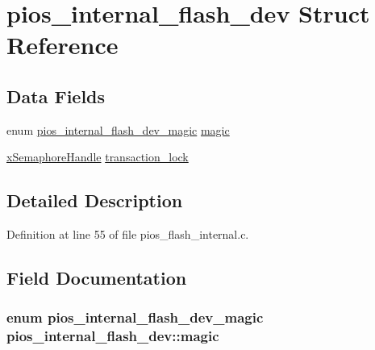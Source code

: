 \hypertarget{structpios__internal__flash__dev}{\section{pios\-\_\-internal\-\_\-flash\-\_\-dev Struct Reference}
\label{structpios__internal__flash__dev}
}
\subsection*{Data Fields}
\begin{DoxyCompactItemize}
\item 
enum \hyperlink{_s_t_m32_f30x_2pios__flash__internal_8c_a0eb1120efd5b8655fe38c410b3eebd5c}{pios\-\_\-internal\-\_\-flash\-\_\-dev\-\_\-magic} \hyperlink{structpios__internal__flash__dev_a552d26ec63649d447047928674b6735e}{magic}
\item 
\hyperlink{_common_2_libraries_2_free_r_t_o_s_2_source_2include_2semphr_8h_aa91aa1b6835a184838f9ccf138a6ad10}{x\-Semaphore\-Handle} \hyperlink{structpios__internal__flash__dev_aff0936adda4381f50332373503f0f34e}{transaction\-\_\-lock}
\end{DoxyCompactItemize}


\subsection{Detailed Description}


Definition at line 55 of file pios\-\_\-flash\-\_\-internal.\-c.



\subsection{Field Documentation}
\hypertarget{structpios__internal__flash__dev_a552d26ec63649d447047928674b6735e}{
\subsubsection[{magic}]{\setlength{\rightskip}{0pt plus 5cm}enum {\bf pios\-\_\-internal\-\_\-flash\-\_\-dev\-\_\-magic} pios\-\_\-internal\-\_\-flash\-\_\-dev\-::magic}}\label{structpios__internal__flash__dev_a552d26ec63649d447047928674b6735e}



